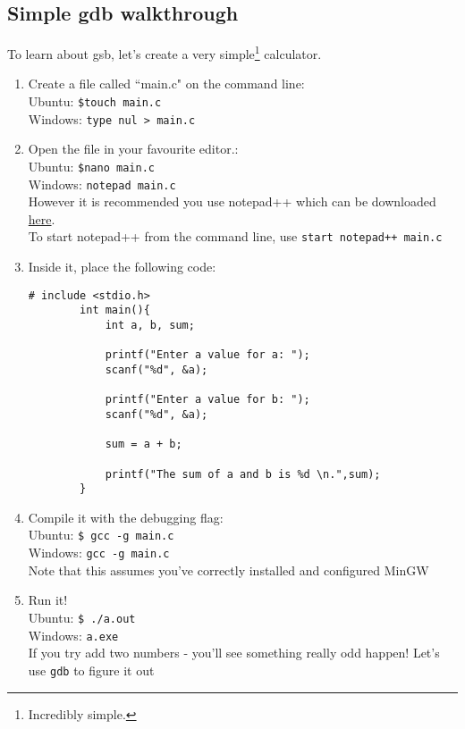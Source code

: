 \subsection{Simple gdb walkthrough}
To learn about gsb, let's create a very simple\footnote{Incredibly simple.} calculator. 
\begin{enumerate}
    \item Create a file called ``main.c" on the command line:\\
        Ubuntu: \verb|$touch main.c|\\ 
        Windows: \verb|type nul > main.c|
    \item Open the file in your favourite editor.:\\
        Ubuntu: \verb|$nano main.c|\\
        Windows: \verb|notepad main.c|\\
        However it is recommended you use notepad++ which can be downloaded   \href{https://notepad-plus-plus.org/downloads/}{here}.\\
        To start notepad++ from the command line, use \verb|start notepad++ main.c|
        
    \item Inside it, place the following code:
        \begin{lstlisting}[gobble=8]
        # include <stdio.h>
        int main(){
	        int a, b, sum;

	        printf("Enter a value for a: ");
	        scanf("%d", &a);

	        printf("Enter a value for b: ");
	        scanf("%d", &a);

	        sum = a + b;

	        printf("The sum of a and b is %d \n.",sum);
        }
        \end{lstlisting}
    \item Compile it with the debugging flag:\\
        Ubuntu: \verb|$ gcc -g main.c|\\
        Windows: \verb|gcc -g main.c| \\ Note that this assumes you've correctly installed and configured MinGW
        
    \item Run it!\\
        Ubuntu: \verb|$ ./a.out|\\
        Windows: \verb|a.exe|\\
        If you try add two numbers - you'll see something really odd happen! Let's use \verb|gdb| to figure it out
   

\end{enumerate}
